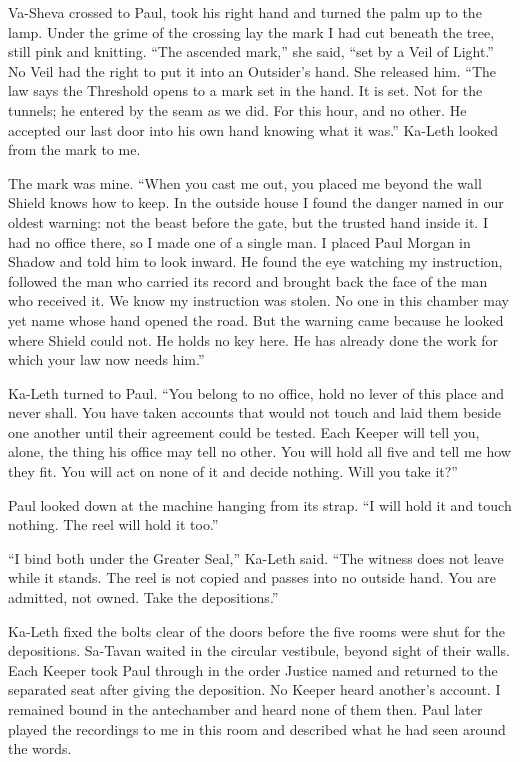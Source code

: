 Va-Sheva crossed to Paul, took his right hand and turned the palm up to the lamp. Under the grime of the crossing lay the mark I had cut beneath the tree, still pink and knitting. ``The ascended mark,'' she said, ``set by a Veil of Light.'' No Veil had the right to put it into an Outsider's hand. She released him. ``The law says the Threshold opens to a mark set in the hand. It is set. Not for the tunnels; he entered by the seam as we did. For this hour, and no other. He accepted our last door into his own hand knowing what it was.'' Ka-Leth looked from the mark to me.\par

The mark was mine. ``When you cast me out, you placed me beyond the wall Shield knows how to keep. In the outside house I found the danger named in our oldest warning: not the beast before the gate, but the trusted hand inside it. I had no office there, so I made one of a single man. I placed Paul Morgan in Shadow and told him to look inward. He found the eye watching my instruction, followed the man who carried its record and brought back the face of the man who received it. We know my instruction was stolen. No one in this chamber may yet name whose hand opened the road. But the warning came because he looked where Shield could not. He holds no key here. He has already done the work for which your law now needs him.''\par

Ka-Leth turned to Paul. ``You belong to no office, hold no lever of this place and never shall. You have taken accounts that would not touch and laid them beside one another until their agreement could be tested. Each Keeper will tell you, alone, the thing his office may tell no other. You will hold all five and tell me how they fit. You will act on none of it and decide nothing. Will you take it?''\par

Paul looked down at the machine hanging from its strap. ``I will hold it and touch nothing. The reel will hold it too.''\par

``I bind both under the Greater Seal,'' Ka-Leth said. ``The witness does not leave while it stands. The reel is not copied and passes into no outside hand. You are admitted, not owned. Take the depositions.''\par

\ornament

Ka-Leth fixed the bolts clear of the doors before the five rooms were shut for the depositions. Sa-Tavan waited in the circular vestibule, beyond sight of their walls. Each Keeper took Paul through in the order Justice named and returned to the separated seat after giving the deposition. No Keeper heard another's account. I remained bound in the antechamber and heard none of them then. Paul later played the recordings to me in this room and described what he had seen around the words.\par

